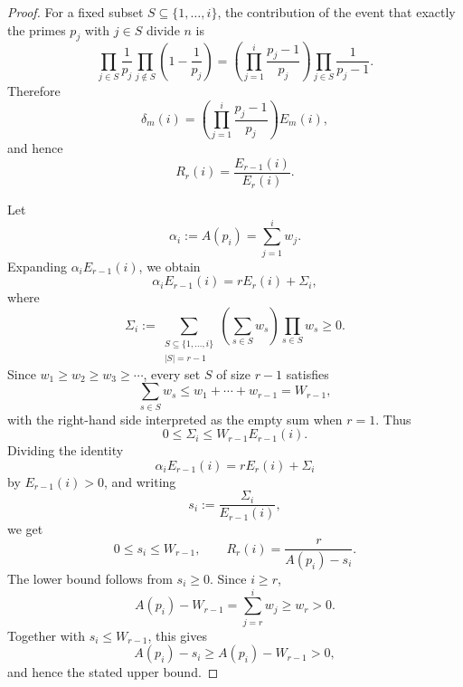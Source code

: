 \documentclass[10pt,a4paper]{amsart}
\begin{document}
\begin{proof}
For a fixed subset \(S\subseteq\{1,\ldots,i\}\), the contribution of the event that exactly the primes \(p_j\) with \(j\in S\) divide \(n\) is
\[
        \prod_{j\in S}\frac1{p_j}
        \prod_{j\notin S}\left(1-\frac1{p_j}\right)
        =
        \left(\prod_{j=1}^i\frac{p_j-1}{p_j}\right)
        \prod_{j\in S}\frac1{p_j-1}.
\]
Therefore
\[
        \delta_m(i)
        =
        \left(\prod_{j=1}^i\frac{p_j-1}{p_j}\right)E_m(i),
\]
and hence
\[
        R_r(i)=\frac{E_{r-1}(i)}{E_r(i)}.
\]

Let
\[
        \alpha_i:=A(p_i)=\sum_{j=1}^i w_j .
\]
Expanding \(\alpha_iE_{r-1}(i)\), we obtain
\[
        \alpha_iE_{r-1}(i)=rE_r(i)+\Sigma_i,
\]
where
\[
        \Sigma_i
        :=
        \sum_{\substack{S\subseteq\{1,\ldots,i\}\\ |S|=r-1}}
        \left(\sum_{s\in S}w_s\right)\prod_{s\in S}w_s
        \ge 0.
\]
Since \(w_1\ge w_2\ge w_3\ge\cdots\), every set \(S\) of size \(r-1\) satisfies
\[
        \sum_{s\in S}w_s\le w_1+\cdots+w_{r-1}=W_{r-1},
\]
with the right-hand side interpreted as the empty sum when \(r=1\).
Thus
\[
        0\le \Sigma_i\le W_{r-1}E_{r-1}(i).
\]
Dividing the identity
\[
        \alpha_iE_{r-1}(i)=rE_r(i)+\Sigma_i
\]
by \(E_{r-1}(i)>0\), and writing
\[
        s_i:=\frac{\Sigma_i}{E_{r-1}(i)},
\]
we get
\[
        0\le s_i\le W_{r-1},
        \qquad
        R_r(i)=\frac r{A(p_i)-s_i}.
\]
The lower bound follows from \(s_i\ge 0\).  Since \(i\ge r\),
\[
        A(p_i)-W_{r-1}
        =\sum_{j=r}^{i}w_j
        \ge w_r>0.
\]
Together with \(s_i\le W_{r-1}\), this gives
\[
        A(p_i)-s_i\ge A(p_i)-W_{r-1}>0,
\]
and hence the stated upper bound.
\end{proof}
\end{document}
